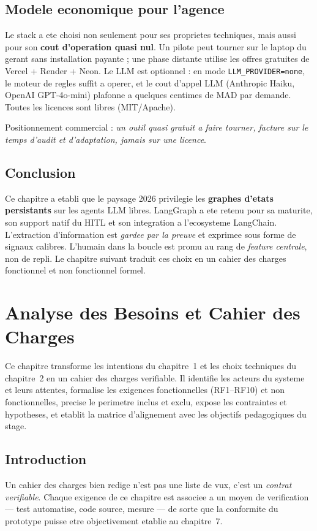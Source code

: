 \documentclass[12pt,a4paper,openany]{report}
\begin{document}
\section{Modele economique pour l'agence}

Le stack a ete choisi non seulement pour ses proprietes techniques, mais aussi pour son \textbf{cout d'operation quasi nul}. Un pilote peut tourner sur le laptop du gerant sans installation payante ; une phase distante utilise les offres gratuites de Vercel + Render + Neon. Le LLM est optionnel : en mode \texttt{LLM\_PROVIDER=none}, le moteur de regles suffit a operer, et le cout d'appel LLM (Anthropic Haiku, OpenAI GPT-4o-mini) plafonne a quelques centimes de MAD par demande. Toutes les licences sont libres (MIT/Apache).

Positionnement commercial : \emph{un outil quasi gratuit a faire tourner, facture sur le temps d'audit et d'adaptation, jamais sur une licence}.

\section{Conclusion}

Ce chapitre a etabli que le paysage 2026 privilegie les \textbf{graphes d'etats persistants} sur les agents LLM libres. LangGraph a ete retenu pour sa maturite, son support natif du HITL et son integration a l'ecosysteme LangChain. L'extraction d'information est \emph{gardee par la preuve} et exprimee sous forme de signaux calibres. L'humain dans la boucle est promu au rang de \emph{feature centrale}, non de repli. Le chapitre suivant traduit ces choix en un cahier des charges fonctionnel et non fonctionnel formel.

\chapter{Analyse des Besoins et Cahier des Charges}\label{chap:besoins}
Ce chapitre transforme les intentions du chapitre~1 et les choix techniques du chapitre~2 en un cahier des charges verifiable. Il identifie les acteurs du systeme et leurs attentes, formalise les exigences fonctionnelles (RF1--RF10) et non fonctionnelles, precise le perimetre inclus et exclu, expose les contraintes et hypotheses, et etablit la matrice d'alignement avec les objectifs pedagogiques du stage.

\section{Introduction}
Un cahier des charges bien redige n'est pas une liste de vux, c'est un \emph{contrat verifiable}. Chaque exigence de ce chapitre est associee a un moyen de verification --- test automatise, code source, mesure --- de sorte que la conformite du prototype puisse etre objectivement etablie au chapitre~7.
\end{document}
